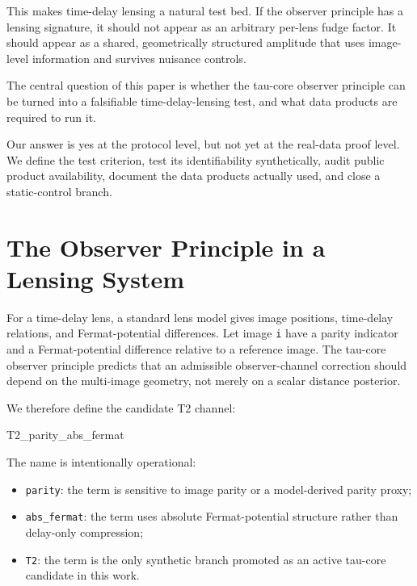 \documentclass[11pt]{article}
\newenvironment{Shaded}{}{}
\newcommand{\NormalTok}[1]{#1}
\providecommand{\tightlist}{%
  \setlength{\itemsep}{0pt}\setlength{\parskip}{0pt}}
\begin{document}
This makes time-delay lensing a natural test bed. If the observer
principle has a lensing signature, it should not appear as an arbitrary
per-lens fudge factor. It should appear as a shared, geometrically
structured amplitude that uses image-level information and survives
nuisance controls.

The central question of this paper is whether the tau-core observer
principle can be turned into a falsifiable time-delay-lensing test, and
what data products are required to run it.

Our answer is yes at the protocol level, but not yet at the real-data
proof level. We define the test criterion, test its identifiability
synthetically, audit public product availability, document the data
products actually used, and close a static-control branch.

\section{The Observer Principle in a Lensing
System}\label{the-observer-principle-in-a-lensing-system}

For a time-delay lens, a standard lens model gives image positions,
time-delay relations, and Fermat-potential differences. Let image
\texttt{i} have a parity indicator and a Fermat-potential difference
relative to a reference image. The tau-core observer principle predicts
that an admissible observer-channel correction should depend on the
multi-image geometry, not merely on a scalar distance posterior.

We therefore define the candidate T2 channel:

\begin{Shaded}
\begin{Highlighting}[]
\NormalTok{T2\_parity\_abs\_fermat}
\end{Highlighting}
\end{Shaded}

The name is intentionally operational:

\begin{itemize}
\tightlist
\item
  \texttt{parity}: the term is sensitive to image parity or a
  model-derived parity proxy;
\item
  \texttt{abs\_fermat}: the term uses absolute Fermat-potential
  structure rather than delay-only compression;
\item
  \texttt{T2}: the term is the only synthetic branch promoted as an
  active tau-core candidate in this work.
\end{itemize}
\end{document}
